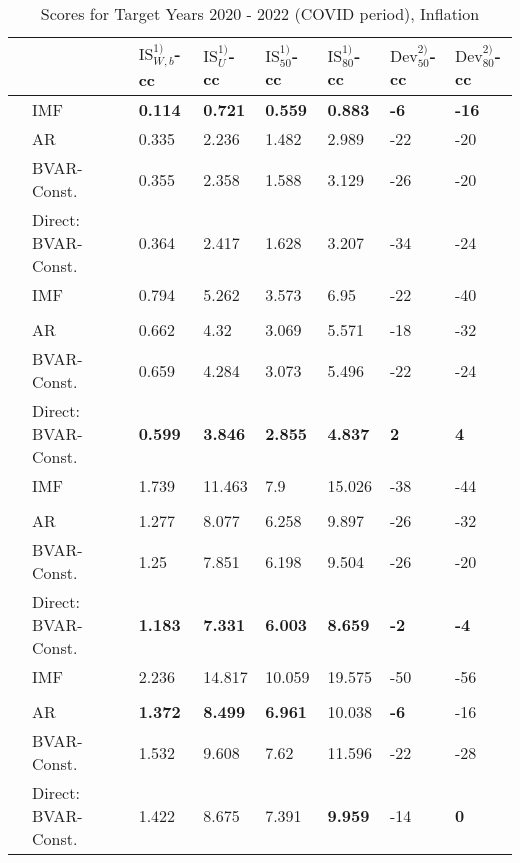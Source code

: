 \begin{table}[!h]
\centering
\caption{Scores for Target Years 2020 - 2022 (COVID period), Inflation}
\centering
\begin{tabular}[t]{llllllll}
\toprule
 &  & $\text{IS}_{W,b}^{1)}$-cc & $\text{IS}_{U}^{1)}$-cc & $\text{IS}_{50}^{1)}$-cc & $\text{IS}_{80}^{1)}$-cc & $\text{Dev}_{50}^{2)}$-cc & $\text{Dev}_{80}^{2)}$-cc\\
\midrule
 & IMF & \textbf{0.114} & \textbf{0.721} & \textbf{0.559} & \textbf{0.883} & \textbf{-6} & \textbf{-16}\\
\parbox[t]{2mm}{}
 & AR & 0.335 & 2.236 & 1.482 & 2.989 & -22 & -20\\
 & BVAR-Const. & 0.355 & 2.358 & 1.588 & 3.129 & -26 & -20\\
 & Direct: BVAR-Const. & 0.364 & 2.417 & 1.628 & 3.207 & -34 & -24\\
\addlinespace
 & IMF & 0.794 & 5.262 & 3.573 & 6.95 & -22 & -40\\
\parbox[t]{2mm}{}\\
 & AR & 0.662 & 4.32 & 3.069 & 5.571 & -18 & -32\\
 & BVAR-Const. & 0.659 & 4.284 & 3.073 & 5.496 & -22 & -24\\
 & Direct: BVAR-Const. & \textbf{0.599} & \textbf{3.846} & \textbf{2.855} & \textbf{4.837} & \textbf{2} & \textbf{4}\\
\addlinespace
 & IMF & 1.739 & 11.463 & 7.9 & 15.026 & -38 & -44\\
\parbox[t]{2mm}{}\\
 & AR & 1.277 & 8.077 & 6.258 & 9.897 & -26 & -32\\
 & BVAR-Const. & 1.25 & 7.851 & 6.198 & 9.504 & -26 & -20\\
 & Direct: BVAR-Const. & \textbf{1.183} & \textbf{7.331} & \textbf{6.003} & \textbf{8.659} & \textbf{-2} & \textbf{-4}\\
\addlinespace
 & IMF & 2.236 & 14.817 & 10.059 & 19.575 & -50 & -56\\
\parbox[t]{2mm}{}\\
 & AR & \textbf{1.372} & \textbf{8.499} & \textbf{6.961} & 10.038 & \textbf{-6} & -16\\
 & BVAR-Const. & 1.532 & 9.608 & 7.62 & 11.596 & -22 & -28\\
 & Direct: BVAR-Const. & 1.422 & 8.675 & 7.391 & \textbf{9.959} & -14 & \textbf{0}\\
\bottomrule
\end{tabular}
\end{table}
